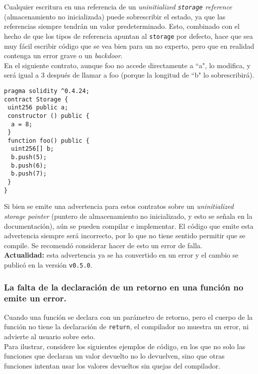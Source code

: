 Cualquier escritura en una referencia de un \textit{uninitialized \texttt{storage} reference} (almacenamiento no inicializada) puede sobrescribir el estado, ya que las referencias siempre tendrán un valor predeterminado. Esto, combinado con el hecho de que los tipos de referencia apuntan al \texttt{storage} por defecto, hace que sea muy fácil escribir código que se vea bien para un no experto, pero que en realidad contenga un error grave o un \textit{backdoor}.\\

En el siguiente contrato, aunque foo no accede directamente a ``a", lo modifica, y será igual a 3 después de llamar a foo (porque la longitud de ``b" lo sobrescribirá).\\

\begin{lstlisting}[language=Solidity]
pragma solidity ^0.4.24;
contract Storage {
 uint256 public a;
 constructor () public {
  a = 8;
 }
 function foo() public {
  uint256[] b;
  b.push(5);
  b.push(6);
  b.push(7);
 }
}
\end{lstlisting}

Si bien se emite una advertencia para estos contratos sobre un \textit{uninitialized storage pointer} (puntero de almacenamiento no inicializado, y esto se señala en la documentación\cite{ReadTHeDocsSolidityMemoryKeyword}), aún se pueden compilar e implementar. El código que emite esta advertencia siempre será incorrecto, por lo que no tiene sentido permitir que se compile. Se recomendó considerar hacer de esto un error de falla.\\

\textbf{Actualidad:} esta advertencia ya se ha convertido en un error y el cambio se publicó\cite{GHPR3521} en la versión \texttt{v0.5.0}.\\

\subsubsection{La falta de la declaración de un retorno en una función no emite un error.}

Cuando una función se declara con un parámetro de retorno, pero el cuerpo de la función no tiene la declaración de \texttt{return}, el compilador no muestra un error, ni advierte al usuario sobre esto.\\

Para ilustrar, considere los siguientes ejemplos de código, en los que no solo las funciones que declaran un valor devuelto no lo devuelven, sino que otras funciones intentan usar los valores devueltos sin quejas del compilador.\\

